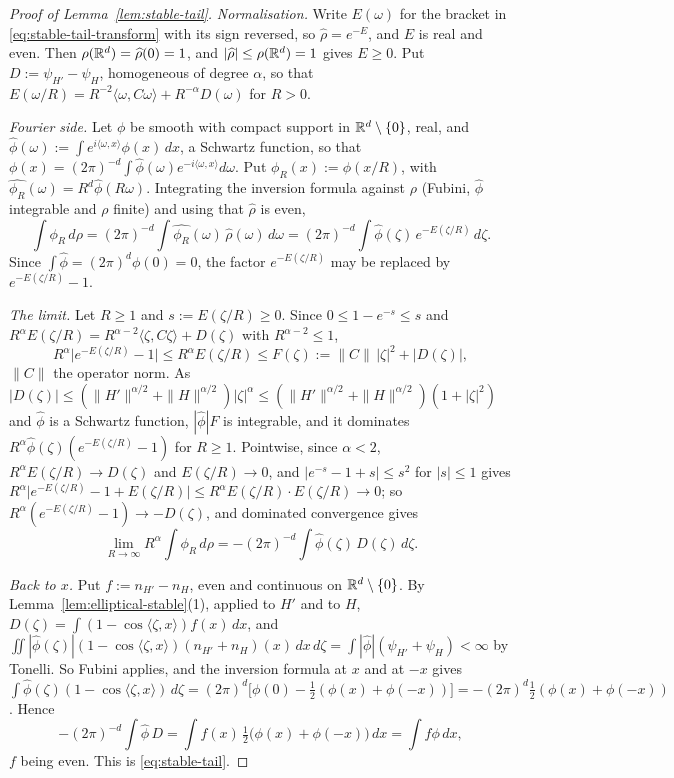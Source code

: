 \begin{proof}[Proof of Lemma~\ref{lem:stable-tail}]
\emph{Normalisation.} Write $E(\omega)$ for the bracket in \ref{eq:stable-tail-transform} with its
sign reversed, so $\widehat\rho = e^{-E}$, and $E$ is real and even. Then $\rho(\mathbb{R}^d) =
\widehat\rho(0) = 1$, and $|\widehat\rho| \le \rho(\mathbb{R}^d) = 1$ gives $E \ge 0$. Put
$D := \psi_{H'} - \psi_H$, homogeneous of degree $\alpha$, so that
$E(\omega/R) = R^{-2}\langle\omega,C\omega\rangle + R^{-\alpha}D(\omega)$ for $R > 0$.

\emph{Fourier side.} Let $\phi$ be smooth with compact support in $\mathbb{R}^d \setminus \{0\}$, real,
and $\widehat\phi(\omega) := \int e^{i\langle\omega,x\rangle}\phi(x)\,dx$, a Schwartz function, so
that $\phi(x) = (2\pi)^{-d}\int\widehat\phi(\omega)e^{-i\langle\omega,x\rangle}d\omega$. Put
$\phi_R(x) := \phi(x/R)$, with $\widehat{\phi_R}(\omega) = R^d\widehat\phi(R\omega)$. Integrating
the inversion formula against $\rho$ (Fubini, $\widehat\phi$ integrable and $\rho$ finite) and using
that $\widehat\rho$ is even,
\[
  \int\phi_R\,d\rho = (2\pi)^{-d}\int\widehat{\phi_R}(\omega)\,\widehat\rho(\omega)\,d\omega
  = (2\pi)^{-d}\int\widehat\phi(\zeta)\,e^{-E(\zeta/R)}\,d\zeta .
\]
Since $\int\widehat\phi = (2\pi)^d\phi(0) = 0$, the factor $e^{-E(\zeta/R)}$ may be replaced by
$e^{-E(\zeta/R)} - 1$.

\emph{The limit.} Let $R \ge 1$ and $s := E(\zeta/R) \ge 0$. Since $0 \le 1 - e^{-s} \le s$ and
$R^\alpha E(\zeta/R) = R^{\alpha-2}\langle\zeta,C\zeta\rangle + D(\zeta)$ with $R^{\alpha-2} \le 1$,
\[
  R^\alpha\bigl|e^{-E(\zeta/R)} - 1\bigr| \le R^\alpha E(\zeta/R) \le F(\zeta)
  := \|C\|\,|\zeta|^2 + |D(\zeta)| ,
\]
$\|C\|$ the operator norm. As $|D(\zeta)| \le (\|H'\|^{\alpha/2} + \|H\|^{\alpha/2})|\zeta|^\alpha \le
(\|H'\|^{\alpha/2} + \|H\|^{\alpha/2})(1 + |\zeta|^2)$ and $\widehat\phi$ is a Schwartz function,
$|\widehat\phi|F$ is integrable, and it dominates
$R^\alpha\widehat\phi(\zeta)(e^{-E(\zeta/R)} - 1)$ for $R \ge 1$. Pointwise, since $\alpha < 2$,
$R^\alpha E(\zeta/R) \to D(\zeta)$ and $E(\zeta/R) \to 0$, and $|e^{-s} - 1 + s| \le s^2$ for
$|s| \le 1$ gives
$R^\alpha\bigl|e^{-E(\zeta/R)} - 1 + E(\zeta/R)\bigr| \le R^\alpha E(\zeta/R)\cdot E(\zeta/R) \to 0$;
so $R^\alpha(e^{-E(\zeta/R)} - 1) \to -D(\zeta)$, and dominated convergence gives
\[
  \lim_{R\to\infty}R^\alpha\int\phi_R\,d\rho = -(2\pi)^{-d}\int\widehat\phi(\zeta)\,D(\zeta)\,d\zeta .
\]

\emph{Back to $x$.} Put $f := n_{H'} - n_H$, even and continuous on $\mathbb{R}^d \setminus \{0\}$. By
Lemma~\ref{lem:elliptical-stable}(1), applied to $H'$ and to $H$,
$D(\zeta) = \int(1 - \cos\langle\zeta,x\rangle)f(x)\,dx$, and
$\iint|\widehat\phi(\zeta)|(1 - \cos\langle\zeta,x\rangle)(n_{H'} + n_H)(x)\,dx\,d\zeta
= \int|\widehat\phi|(\psi_{H'} + \psi_H) < \infty$ by Tonelli. So Fubini applies, and the inversion
formula at $x$ and at $-x$ gives
$\int\widehat\phi(\zeta)(1 - \cos\langle\zeta,x\rangle)\,d\zeta = (2\pi)^d\bigl[\phi(0) -
\tfrac12(\phi(x) + \phi(-x))\bigr] = -(2\pi)^d\tfrac12(\phi(x) + \phi(-x))$. Hence
\[
  -(2\pi)^{-d}\int\widehat\phi\,D = \int f(x)\,\tfrac12\bigl(\phi(x) + \phi(-x)\bigr)\,dx
  = \int f\phi\,dx ,
\]
$f$ being even. This is \ref{eq:stable-tail}.


\end{proof}

